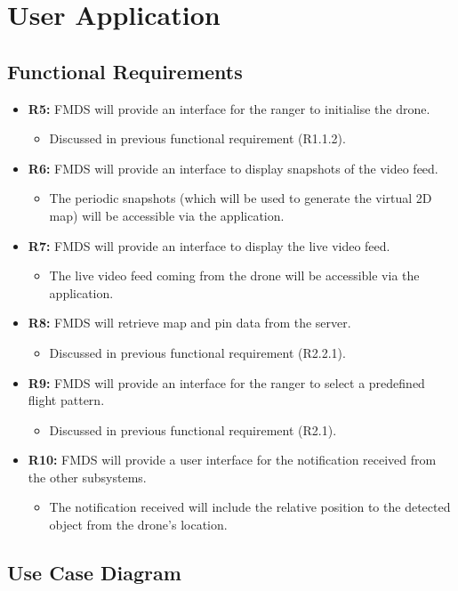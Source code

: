 \section{User Application}

\subsection{Functional Requirements}

	\begin{flushleft}
		\begin{itemize}
			\item{\textbf{R5:}} FMDS will provide an interface for the ranger to initialise the drone.
				\begin{itemize}
					\item Discussed in previous functional requirement (R1.1.2).
				\end{itemize} 
			\item{\textbf{R6:}} FMDS will provide an interface to display snapshots of the video feed.
				\begin{itemize}
					\item The periodic snapshots (which will be used to generate the virtual 2D map) will be accessible via the application.
				\end{itemize} 
			\item{\textbf{R7:}} FMDS will provide an interface to display the live video feed.
				\begin{itemize}
					\item The live video feed coming from the drone will be accessible via the application.
				\end{itemize} 
			\item{\textbf{R8:}} FMDS will retrieve map and pin data from the server.
				\begin{itemize}
					\item Discussed in previous functional requirement (R2.2.1).
				\end{itemize} 
			\item{\textbf{R9:}} FMDS will provide an interface for the ranger to select a predefined flight pattern.
				\begin{itemize}
					\item Discussed in previous functional requirement (R2.1).
				\end{itemize} 
			\item{\textbf{R10:}} FMDS will provide a user interface for the notification received from the other subsystems.
				\begin{itemize}
					\item The notification received will include the relative position to the detected object from the drone's location.
				\end{itemize} 
		\end{itemize}

	\end{flushleft}

\subsection{Use Case Diagram}
	\begin{center}
	\end{center}
